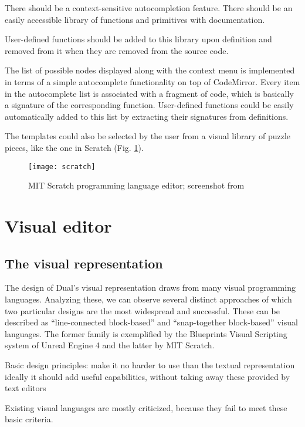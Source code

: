 There should be a context-sensitive autocompletion feature. There should be an easily accessible library of functions and primitives with documentation.

User-defined functions should be added to this library upon definition and removed from it when they are removed from the source code.


The list of possible nodes displayed along with the context menu is implemented
in terms of a simple autocomplete functionality on top of CodeMirror. Every item
in the autocomplete list is associated with a fragment of code, which is
basically a signature of the corresponding function. User-defined functions
could be easily automatically added to this list by extracting their signatures
from definitions.

The templates could also be selected by the user from a visual library of puzzle
pieces, like the one in Scratch (Fig. \ref{fig:scratch}).
\begin{figure}[h!]
\centering \texttt{[image: scratch]}
\caption{
    MIT Scratch programming language editor;
    screenshot from\protect\cite{fig_scratch}
}
\label{fig:scratch}
\end{figure}


\section{Visual editor}
\subsection{The visual representation}
The design of Dual's visual representation draws from many visual programming
languages. Analyzing these, we can observe several distinct approaches of which two particular designs are the most widespread and successful. These can be
described as ``line-connected block-based'' and ``snap-together block-based''
visual languages. The former family is exemplified by the Blueprints Visual
Scripting system of Unreal Engine 4\cite{blueprint} and the latter by MIT Scratch\cite{scratch, scratch_wikipedia}.


Basic design principles: make it no harder to use than the textual
representation ideally it should add useful capabilities, without taking away
these provided by text editors

Existing visual languages are mostly criticized, because they fail to meet these
basic criteria.

